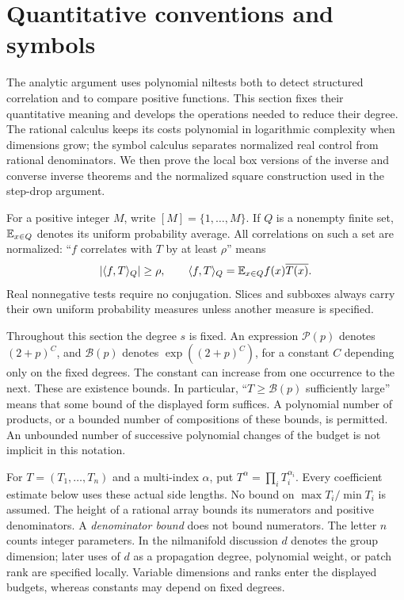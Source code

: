 \section{Quantitative conventions and symbols}\label{prelim:section}

The analytic argument uses polynomial niltests both to detect structured
correlation and to compare positive functions. This section fixes their
quantitative meaning and develops the operations needed to reduce their
degree. The rational calculus keeps its costs polynomial in logarithmic
complexity when dimensions grow; the symbol calculus separates normalized
real control from rational denominators. We then prove the local box
versions of the inverse and converse inverse theorems and the normalized
square construction used in the step-drop argument.

For a positive integer $M$, write $[M]=\{1,\ldots,M\}$.
If $Q$ is a nonempty finite set, $\mathbb E_{x\in Q}$ denotes its
uniform probability average.  All correlations on such a set are
normalized: ``$f$ correlates with $T$ by at least $\rho$'' means
\[
 |\langle f,T\rangle_Q|\geq\rho,\qquad
 \langle f,T\rangle_Q=\mathbb E_{x\in Q}f(x)\overline{T(x)}.
\]
Real nonnegative tests require no conjugation.  Slices and subboxes
always carry their own uniform probability measures unless another
measure is specified.

Throughout this section the degree $s$ is fixed.  An expression
$\mathcal P(p)$ denotes $(2+p)^C$, and $\mathcal B(p)$ denotes
$\exp((2+p)^C)$, for a constant $C$ depending only on the fixed degrees.
The constant can increase from one occurrence to the next.  These are
existence bounds.  In particular, ``$T\geq\mathcal B(p)$ sufficiently
large'' means that some bound of the displayed form suffices.  A
polynomial number of products, or a bounded number of compositions of
these bounds, is permitted.  An unbounded number of successive
polynomial changes of the budget is not implicit in this notation.

For $T=(T_1,\ldots,T_n)$ and a multi-index $\alpha$, put
$T^\alpha=\prod_iT_i^{\alpha_i}$.  Every coefficient estimate below uses
these actual side lengths.  No bound on $\max T_i/\min T_i$ is assumed.
The height of a rational array bounds its numerators and positive
denominators.  A \emph{denominator bound} does not bound numerators.
The letter $n$ counts integer parameters.  In the nilmanifold
discussion $d$ denotes the group dimension; later uses of $d$ as a
propagation degree, polynomial weight, or patch rank are specified
locally.  Variable dimensions and ranks enter the displayed budgets,
whereas constants may depend on fixed degrees.

